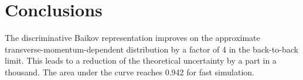 \section{Conclusions}\label{sec:conclusions}

The discriminative Baikov representation improves on the approximate
transverse-momentum-dependent distribution by a factor of 4 in the
back-to-back limit. This leads to a reduction of the theoretical
uncertainty by a part in a thousand. The area under the curve reaches
0.942 for fast simulation.

